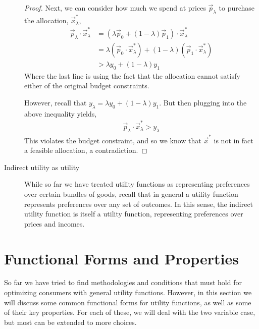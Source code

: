 \begin{description}
\begin{proof}
        Next, we can consider how much we spend at prices $\vec{p}_\lambda$ to purchase the allocation, $\vec{x}^*_\lambda$,
        \begin{align*}
            \vec{p}_\lambda \cdot \vec{x}^*_\lambda &= (\lambda \vec{p}_0 + (1 - \lambda) \vec{p}_1) \cdot \vec{x}^*_\lambda \\
            &= \lambda (\vec{p}_0 \cdot \vec{x}^*_\lambda) + (1 - \lambda) (\vec{p}_1 \cdot \vec{x}^*_\lambda) \\
            &> \lambda y_0 + (1 - \lambda) y_1
        \end{align*}
        Where the last line is using the fact that the allocation cannot satisfy either of the original budget constraints. 

        However, recall that $y_\lambda = \lambda y_0 + (1 - \lambda)y_1$. But then plugging into the above inequality yields,
        \begin{align*}
            \vec{p}_\lambda \cdot \vec{x}^*_\lambda > y_\lambda
        \end{align*}
        This violates the budget constraint, and so we know that $\vec{x}^*$ is not in fact a feasible allocation, a contradiction. 
    \end{proof}
    \item[Indirect utility as utility] While so far we have treated utility functions as representing preferences over certain bundles of goods, recall that in general a utility function represents preferences over any set of outcomes. In this sense, the indirect utility function is itself a utility function, representing preferences over prices and incomes. 
\end{description}

\section{Functional Forms and Properties}
So far we have tried to find methodologies and conditions that must hold for optimizing consumers with general utility functions. However, in this section we will discuss some common functional forms for utility functions, as well as some of their key properties. For each of these, we will deal with the two variable case, but most can be extended to more choices. 


